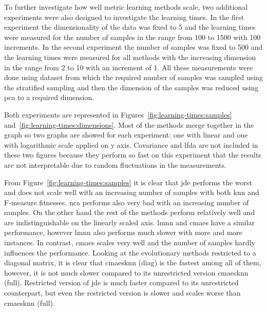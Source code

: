 \documentclass[12pt,a4paper]{report}
\begin{document}


To further investigate how well metric learning methods scale, two additional experiments were also designed to investigate the learning times. In the first experiment the dimensionality of the data was fixed to 5 and the learning times were measured for the number of samples in the range from 100 to 1500 with 100 increments. In the second experiment the number of samples was fixed to 500 and the learning times were measured for all methods with the increasing dimension in the range from 2 to 10 with an increment of 1. All these measurements were done using  dataset from which the required number of samples was sampled using the stratified sampling and then the dimension of the samples was reduced using \ac{pca} to a required dimension.

Both experiments are represented in Figures~\ref{fig:learning-times:samples} and~\ref{fig:learning-times:dimensions}. Most of the methods merge together in the graph so two graphs are showed for each experiment: one with linear and one with logarithmic scale applied on y axis. Covariance and \ac{lfda} are not included in these two figures because they perform so fast on this experiment that the results are not interpretable due to random fluctuations in the measurements.

From Figure~\ref{fig:learning-times:samples} it is clear that \ac{jde} performs the worst and does not scale well with an increasing number of samples with both \ac{knn} and \mbox{F-measure} fitnesses. \ac{nca} performs also very bad with an increasing number of samples. On the other hand the rest of the methods perform relatively well and are indistinguishable on the linearly scaled axis. \ac{lmnn} and \ac{cmaes} have a similar performance, however \ac{lmnn} also performs much slower with more and more instances. In contrast, \ac{cmaes} scales very well and the number of samples hardly influences the performance. Looking at the evolutionary methods restricted to a diagonal matrix, it is clear that \ac{cmaesknn} (diag) is the fastest among all of them, however, it is not much slower compared to its unrestricted version \ac{cmaesknn} (full). Restricted version of \ac{jde} is much faster compared to its unrestricted counterpart, but even the restricted version is slower and scales worse than \ac{cmaesknn} (full).

\end{document}
